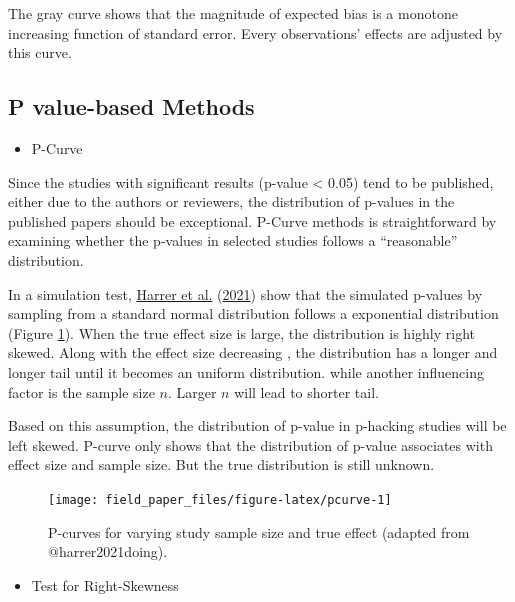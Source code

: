 \documentclass[
  11pt,
  openany]{memoir}
\providecommand{\tightlist}{%
  \setlength{\itemsep}{0pt}\setlength{\parskip}{0pt}}
\begin{document}
The gray curve shows that the magnitude of expected bias is a monotone increasing function of standard error.
Every observations' effects are adjusted by this curve.

\hypertarget{p-value-based-methods}{%
\subsection{P value-based Methods}\label{p-value-based-methods}}

\begin{itemize}
\tightlist
\item
  P-Curve
\end{itemize}

Since the studies with significant results (p-value \textless{} 0.05) tend to be published, either due to the authors or reviewers, the distribution of p-values in the published papers should be exceptional.
P-Curve methods is straightforward by examining whether the p-values in selected studies follows a ``reasonable'' distribution.

In a simulation test, \protect\hyperlink{ref-harrer2021doing}{Harrer et al.} (\protect\hyperlink{ref-harrer2021doing}{2021}) show that the simulated p-values by sampling from a standard normal distribution follows a exponential distribution (Figure \ref{fig:pcurve}).
When the true effect size is large, the distribution is highly right skewed.
Along with the effect size decreasing , the distribution has a longer and longer tail until it becomes an uniform distribution.
while another influencing factor is the sample size \(n\).
Larger \(n\) will lead to shorter tail.

Based on this assumption, the distribution of p-value in p-hacking studies will be left skewed.
P-curve only shows that the distribution of p-value associates with effect size and sample size.
But the true distribution is still unknown.

\begin{figure}

{\centering \texttt{[image: field\_paper\_files/figure-latex/pcurve-1]} 

}

\caption{P-curves for varying study sample size and true effect (adapted from @harrer2021doing).}\label{fig:pcurve}
\end{figure}

\begin{itemize}
\tightlist
\item
  Test for Right-Skewness
\end{itemize}
\end{document}
